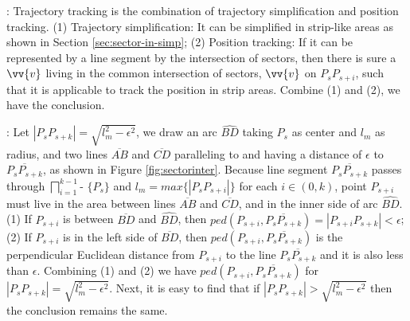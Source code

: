 :
Trajectory tracking is the combination of trajectory simplification and position tracking.
%
(1) Trajectory simplification: It can be simplified in strip-like areas as shown in Section \ref{sec:sector-in-simp};
%
(2) Position tracking: If it can be represented by a line segment by the intersection of sectors, then there is sure a $\vv{v}$ living in the common intersection of sectors, \eg $\vv{v}$ on $P_sP_{s+i}$, such that it is applicable to track the position in strip areas.
%
Combine (1) and (2), we have the conclusion.
\eop


:
Let $|P_sP_{s+k}| = \sqrt{l_m^2 - \epsilon^2}$, we draw an arc $\widehat{BD}$ taking $P_s$ as center and $l_m$ as radius, and two lines $\overline{AB}$ and $\overline{CD}$ paralleling to and having a distance of $\epsilon$ to $\overline{P_sP_{s+k}}$, as shown in Figure \ref{fig:sectorinter}.
Because line segment $\overline{P_sP_{s+k}}$ passes through $\bigsqcap_{i=1}^{k-1}$- $\{P_s\}$ and $l_{m} = max\{|P_sP_{s+i}|\}$ for each $i \in (0, k)$, point $P_{s+i}$ must live in the area between lines $\overline{AB}$ and $\overline{CD}$, and in the inner side of arc $\widehat{BD}$.
(1) If $P_{s+i}$ is between $\overline{BD}$ and $\widehat{BD}$, then $ped(P_{s+i}, \overline{P_sP_{s+k}}) = |{P_{s+i}P_{s+k}}| < \epsilon$; 
(2) If $P_{s+i}$ is in the left side of $\overline{BD}$, then  $ped(P_{s+i}, \overline{P_sP_{s+k}})$ is the perpendicular Euclidean distance from $P_{s+i}$ to the line $\overline{P_sP_{s+k}}$ and it is also less than $\epsilon$. Combining (1) and (2) we have $ped(P_{s+i}, \overline{P_sP_{s+k}})$ for $|P_sP_{s+k}| = \sqrt{l_m^2 - \epsilon^2}$.
Next, it is easy to find that if $|P_sP_{s+k}| > \sqrt{l_m^2 - \epsilon^2}$ then the conclusion remains the same.
\eop

